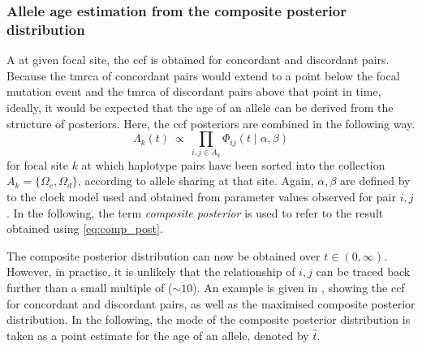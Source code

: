 %


%
\subsubsection{Allele age estimation from the composite posterior distribution}\label{sec:comp_post_detail}
%


A at given focal site, the \gls{ccf} is obtained for concordant and discordant pairs.
Because the \gls{tmrca} of concordant pairs would extend to a point below the focal mutation event and the \gls{tmrca} of discordant pairs above that point in time, ideally, it would be expected that the age of an allele can be derived from the structure of posteriors.
Here, the \gls{ccf} posteriors are combined in the following way.
\begin{equation}\label{eq:comp_post}
	\Lambda_k(t)~\propto~\prod_{i,j \in A_k} \Phi_{ij}(t\mid\alpha,\beta)
\end{equation}
for focal site $k$ at which haplotype pairs have been sorted into the collection ${A_k=\{\Omega_c,\Omega_d\}}$, according to allele sharing at that site.
Again, ${\alpha,\beta}$ are defined by to the clock model used and obtained from parameter values observed for pair ${i,j}$.
In the following, the term \emph{composite posterior} is used to refer to the result obtained using \cref{eq:comp_post}.

%

%

The composite posterior distribution can now be obtained over ${t \in (0,\infty)}$.
However, in practise, it is unlikely that the relationship of ${i,j}$ can be traced back further than a small multiple of \Ne (\eg $\sim 10$).
An example is given in , showing the \gls{ccf} for concordant and discordant pairs, as well as the maximised composite posterior distribution.
In the following, the mode of the composite posterior distribution is taken as a point estimate for the age of an allele, denoted by $\hat{t}$.



